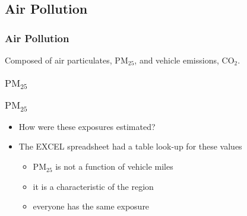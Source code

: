 \documentclass[handout,13pt,compress,c]{beamer}
\newcommand{\bi}{\begin{itemize}}
\newcommand{\ei}{\end{itemize}}
\begin{document}
\subsection{Air Pollution}
\begin{frame}[fragile]
\frametitle{Air Pollution}
Composed of air particulates, $\mathrm{PM}_{25}$, and vehicle emissions, $\mathrm{CO}_{2}$.
\end{frame}
\subsubsection{$\mathrm{PM}_{25}$}
\begin{frame}[fragile]
\frametitle{$\mathrm{PM}_{25}$}
\bi
\item How were these exposures estimated?
\item The EXCEL spreadsheet had a table look-up for these values
\bi\item $\mathrm{PM}_{25}$ is not a function of vehicle miles
\item it is a characteristic of the region
\item everyone has the same exposure \ei
\ei
\end{frame}
\end{document}
